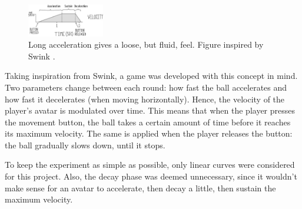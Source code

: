 \begin{figure}[htbp]
\centering
\includegraphics[width=0.30\textwidth]{Pics/adsr_loose}
\caption{Long acceleration gives a loose, but fluid, feel. Figure inspired by Swink \cite{swink}.}
\label{fig:adsr_loose}
\end{figure}

Taking inspiration from Swink, a game was developed with this concept in mind. Two parameters change between each round: how fast the ball accelerates and how fast it decelerates (when moving horizontally). Hence, the velocity of the player's avatar is modulated over time. This means that when the player presses the movement button, the ball takes a certain amount of time before it reaches its maximum velocity. The same is applied when the player releases the button: the ball gradually slows down, until it stops.

To keep the experiment as simple as possible, only linear curves were considered for this project. Also, the decay phase was deemed unnecessary, since it wouldn't make sense for an avatar to accelerate, then decay a little, then sustain the maximum velocity.


